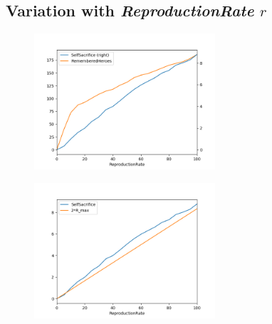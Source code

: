 \documentclass[a4paper,12pt]{report}
\begin{document}
\subsection{Variation with \emph{ReproductionRate} $r$}

\begin{figure}[h]
    \centering
    \includegraphics[width=0.6\textwidth]{Repro}
    \caption{}
    \label{fig:r}
    \end{figure}

    \begin{figure}[h]
        \centering
        \includegraphics[width=0.6\textwidth]{Repro_magie}
        \caption{}
        \label{fig:r_magie}
        \end{figure}


\end{document}
